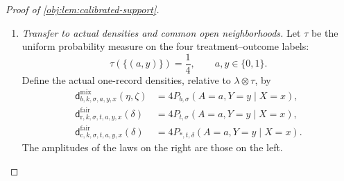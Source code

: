 \begin{proof}[Proof of \cref{obj:lem:calibrated-support}]
\begin{enumerate}
For the fair cells, the selected root belongs to \((3/10,1/2)\); this includes its default value \(2/5\). Since
\[
|\delta Z_u(\mathbf s)|\le\frac1{50},
\]
both fair control risks belong to \([1/4,3/5]\).
For \(t\in[0,1/4]\), the elementary exponential estimate gives
\[
0\le e^t-1\le\frac43t\le\frac13.
\]
The comparator effect lies between \(t/2\) and \(t\), by
\cref{obj:lem:exact-calibrations}. Thus the effect used in either fair branch lies in \([0,1/4]\). For
\(\vartheta\in[0,1/4]\) and \(\xi\in[1/4,3/5]\),
\[
\mathsf G(\vartheta,\xi)
=\frac{e^\vartheta\xi}{1+(e^\vartheta-1)\xi},
\qquad
\frac14\le\mathsf G(\vartheta,\xi)\le\frac34.
\]
To check the last bounds, the denominator is positive; multiplication by it reduces the lower bound to
\[
(1+e^\vartheta-1)\xi
\ge\frac14\{1+(e^\vartheta-1)\xi\},
\]
using \(\xi\ge1/4\), and the upper bound follows from
\(\xi\le3/5\) and \(e^\vartheta-1\le1/3\).
Consequently both fair arm risks and their complements are at least \(1/4\), and
\[
\frac12\le4\pi^{\mathrm{fair}}_{\iota,\mathbf s,ay}\le2.
\]

Finally, direct addition of either four-cell formula gives
\[
\sum_{a,y}\pi^{\mathrm{mix}}_{b,\mathbf s,ay}=1,
\qquad
\sum_{a,y}\pi^{\mathrm{fair}}_{\iota,\mathbf s,ay}=1.
\]
Every cell lies in \([1/8,1/2]\), so the cells are strictly interior. Together with continuity, this proves validity throughout both doubled closed boxes. The constructed laws therefore retain their supplied cells there.

\item \textit{Transfer to actual densities and common open neighborhoods.}
Let \(\tau\) be the uniform probability measure on the four treatment--outcome labels:
\[
\tau(\{(a,y)\})=\frac14,\qquad a,y\in\{0,1\}.
\]
Define the actual one-record densities, relative to \(\lambda\otimes\tau\), by
\[
\begin{aligned}
\mathsf d^{\mathrm{mix}}_{b,k,\sigma,a,y,x}(\eta,\zeta)
&=4P_{b,\sigma}(A=a,Y=y\mid X=x),\\
\mathsf d^{\mathrm{fair}}_{\mathrm r,k,\sigma,t,a,y,x}(\delta)
&=4P_{t,\sigma}(A=a,Y=y\mid X=x),\\
\mathsf d^{\mathrm{fair}}_{\mathrm c,k,\sigma,t,a,y,x}(\delta)
&=4P_{*,t,\delta}(A=a,Y=y\mid X=x).
\end{aligned}
\]
The amplitudes of the laws on the right are those on the left.


\end{enumerate}
\end{proof}
